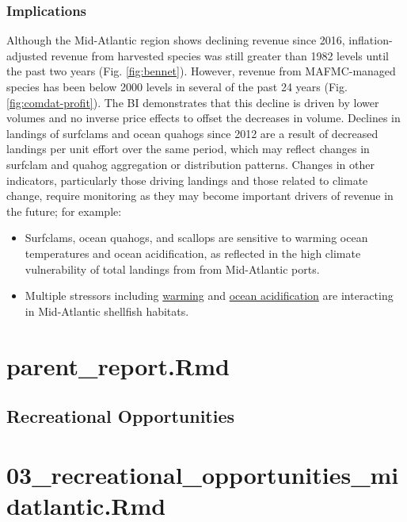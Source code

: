 \documentclass[
  10pt,
]{article}
\providecommand{\tightlist}{%
  \setlength{\itemsep}{0pt}\setlength{\parskip}{0pt}}
\begin{document}
\subsubsection{Implications}\label{implications-1}

Although the Mid-Atlantic region shows declining revenue since 2016, inflation-adjusted revenue from harvested species was still greater than 1982 levels until the past two years (Fig. \ref{fig:bennet}). However, revenue from MAFMC-managed species has been below 2000 levels in several of the past 24 years (Fig. \ref{fig:comdat-profit}). The BI demonstrates that this decline is driven by lower volumes and no inverse price effects to offset the decreases in volume. Declines in landings of surfclams and ocean quahogs since 2012 are a result of decreased landings per unit effort over the same period, which may reflect changes in surfclam and quahog aggregation or distribution patterns. Changes in other indicators, particularly those driving landings and those related to climate change, require monitoring as they may become important drivers of revenue in the future; for example:

\begin{itemize}
\tightlist
\item
  Surfclams, ocean quahogs, and scallops are sensitive to warming ocean temperatures and ocean acidification, as reflected in the high climate vulnerability of total landings from from Mid-Atlantic ports.
\item
  Multiple stressors including \href{https://noaa-edab.github.io/catalog/bottom_temp_insitu.html}{warming} and \href{https://noaa-edab.github.io/catalog/ocean_acidification}{ocean acidification} are interacting in Mid-Atlantic shellfish habitats.
\end{itemize}

\section{parent\_report.Rmd}\label{parent_report.rmd-2}

\subsection{Recreational Opportunities}\label{recreational-opportunities}

\section{03\_recreational\_opportunities\_midatlantic.Rmd}\label{recreational_opportunities_midatlantic.rmd}
\end{document}
